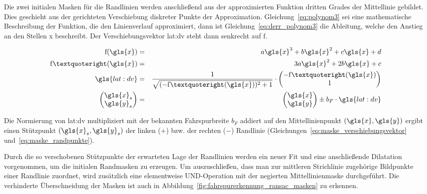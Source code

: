 Die zwei initialen Masken für die Randlinien werden anschließend aus der approximierten Funktion dritten Grades der Mittellinie gebildet. Dies geschieht aus der gerichteten Verschiebung diskreter Punkte der Approximation. Gleichung~\ref{eq:polynom3} sei eine mathematische Beschreibung der Funktion, die den Linienverlauf approximiert, dann ist Gleichung~\ref{eq:derr_polynom3} die Ableitung, welche den Anstieg an den Stellen \gls{x} beschreibt. Der Verschiebungsvektor \gls{lat:dv} steht dann senkrecht auf \( \mathrm{f} \).

\begin{eqnarray}
\mathrm{f}(\gls{x}) & = & a{\gls{x}}^3 + b{\gls{x}}^2 +c{\gls{x}} +d  \label{eq:polynom3} 	\\
\mathrm{f}’(\gls{x}) & = & 3a{\gls{x}}^2 + 2b\gls{x} +c \label{eq:derr_polynom3} 							\\
\gls{lat:dv} & = & \frac{1}{\sqrt{(-\mathrm{f}’(\gls{x}))^2 + 1}} \cdot
\begin{pmatrix}
-\mathrm{f}’(\gls{x}) 	\\
1 		\\
\end{pmatrix}
\label{eq:maske_verschiebungsvektor}									\\
\begin{pmatrix}
{\gls{x}}_s 	\\
{\gls{y}}_s	\\
\end{pmatrix}
 & = & 
 \begin{pmatrix}
\gls{x} 	\\
\gls{y}	\\
\end{pmatrix}
\pm b_F \cdot \gls{lat:dv}  
\label{eq:maske_randpunkte}
\end{eqnarray}

Die Normierung von \gls{lat:dv} multipliziert mit der bekannten Fahrspurbreite \( b_F \) addiert auf den Mittellinienpunkt \( (\gls{x},\gls{y}) \) ergibt einen Stützpunkt \( ({\gls{x}}_s,{\gls{y}}_s) \) der linken (\( + \)) bzw. der rechten (\( - \)) Randlinie (Gleichungen~\ref{eq:maske_verschiebungsvektor} und~\ref{eq:maske_randpunkte}).

Durch die so verschobenen Stützpunkte der erwarteten Lage der Randlinien werden ein neuer Fit und eine anschließende Dilatation vorgenommen, um die initialen Randmasken zu erzeugen. Um auszuschließen, dass man zur mittleren Strichlinie zugehörige Bildpunkte einer Randlinie zuordnet, wird zusätzlich eine elementweise UND-Operation mit der negierten Mittellinienmaske durchgeführt. Die verhinderte Überschneidung der Masken ist auch in Abbildung~\ref{fig:fahrspurerkennung_ransac_masken} zu erkennen.


